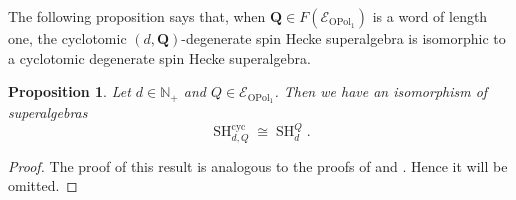 \documentclass[11pt]{amsart}
\newtheorem{prop}[theo]{Proposition}
\theoremstyle{definition}
\numberwithin{equation}{section}
\begin{document}
The following proposition says that, when $ \mathbf{Q} \in F(\mathcal{E}_{\operatorname{OPol}_{1}}) $ is a word of length one, the cyclotomic $ (d,\mathbf{Q}) $-degenerate spin Hecke superalgebra is isomorphic to a cyclotomic degenerate spin Hecke superalgebra. 




\begin{prop} \label{frontlines}
Let $ d \in \mathbb{N}_{+} $ and $ Q \in \mathcal{E}_{\operatorname{OPol}_{1}} $. Then we have an isomorphism of superalgebras 
\begin{equation*}
\operatorname{SH}^{\operatorname{cyc}}_{d,Q}  \cong \operatorname{SH}^{Q}_{d}.
\end{equation*}
\end{prop}

\begin{proof}
The proof of this result is analogous to the proofs of \cite[Thm.~4.18]{Webster} and \cite[Thm.~5.34]{Moran}. Hence it will be omitted.
\end{proof}
\end{document}

